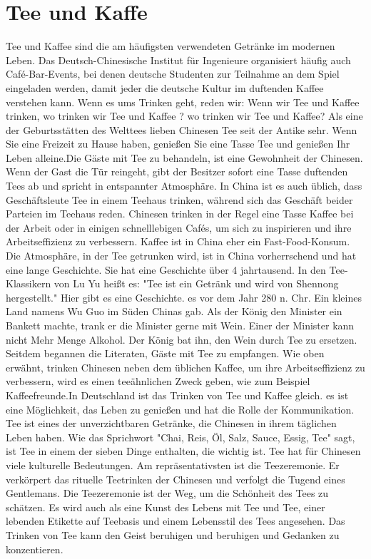 \section{Tee und Kaffe}
Tee und Kaffee sind die am häufigsten verwendeten Getränke im modernen Leben. Das Deutsch-Chinesische Institut für Ingenieure organisiert häufig auch Café-Bar-Events, bei denen deutsche Studenten zur Teilnahme an dem Spiel eingeladen werden, damit jeder die deutsche Kultur im duftenden Kaffee verstehen kann.
\mypar
Wenn es ums Trinken geht, reden wir: Wenn wir Tee und Kaffee trinken, wo trinken wir Tee und Kaffee ? wo trinken wir Tee und Kaffee? Als eine der Geburtsstätten des Welttees lieben Chinesen Tee seit der Antike sehr. Wenn Sie eine Freizeit zu Hause haben, genießen Sie eine Tasse Tee und genießen Ihr Leben alleine.Die Gäste mit Tee zu behandeln, ist eine Gewohnheit der Chinesen. Wenn der Gast die Tür reingeht, gibt der Besitzer sofort eine Tasse duftenden Tees ab und spricht in entspannter Atmosphäre. In China ist es auch üblich, dass Geschäftsleute Tee in einem Teehaus trinken, während sich das Geschäft beider Parteien im Teehaus reden.
\mypar
Chinesen trinken in der Regel eine Tasse Kaffee bei der Arbeit oder in einigen schnelllebigen Cafés, um sich zu inspirieren und ihre Arbeitseffizienz zu verbessern. Kaffee ist in China eher ein Fast-Food-Konsum. Die Atmosphäre, in der Tee getrunken wird, ist in China vorherrschend und hat eine lange Geschichte. Sie hat eine Geschichte über 4 jahrtausend. In den Tee-Klassikern von Lu Yu heißt es: "Tee ist ein Getränk und wird von Shennong hergestellt."
Hier gibt es eine Geschichte. es vor dem Jahr 280 n. Chr. Ein kleines Land namens Wu Guo im Süden Chinas gab. Als der König den Minister ein Bankett machte, trank er die Minister gerne mit Wein. Einer der Minister kann nicht Mehr Menge Alkohol. Der König bat ihn, den Wein durch Tee zu ersetzen. Seitdem begannen die Literaten, Gäste mit Tee zu empfangen. Wie oben erwähnt, trinken Chinesen neben dem üblichen Kaffee, um ihre Arbeitseffizienz zu verbessern, wird es einen teeähnlichen Zweck geben, wie zum Beispiel Kaffeefreunde.In Deutschland ist das Trinken von Tee und Kaffee gleich. es ist eine Möglichkeit, das Leben zu genießen und hat die Rolle der Kommunikation.
\mypar
Tee ist eines der unverzichtbaren Getränke, die Chinesen in ihrem täglichen Leben haben. Wie das Sprichwort "Chai, Reis, Öl, Salz, Sauce, Essig, Tee" sagt, ist Tee in einem der sieben Dinge enthalten, die wichtig ist. Tee hat für Chinesen viele kulturelle Bedeutungen. Am repräsentativsten ist die Teezeremonie. Er verkörpert das rituelle Teetrinken der Chinesen und verfolgt die Tugend eines Gentlemans. Die Teezeremonie ist der Weg, um die Schönheit des Tees zu schätzen. Es wird auch als eine Kunst des Lebens mit Tee und Tee, einer lebenden Etikette auf Teebasis und einem Lebensstil des Tees angesehen.  Das Trinken von Tee kann den Geist beruhigen und beruhigen und Gedanken zu konzentieren.
